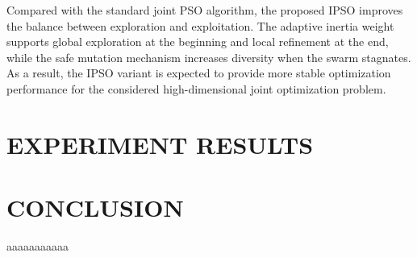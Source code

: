 \documentclass[conference]{IEEEtran}
\begin{document}
Compared with the standard joint PSO algorithm, the proposed IPSO improves the balance between exploration and exploitation. The adaptive inertia weight supports global exploration at the beginning and local refinement at the end, while the safe mutation mechanism increases diversity when the swarm stagnates. As a result, the IPSO variant is expected to provide more stable optimization performance for the considered high-dimensional joint optimization problem.



\section{EXPERIMENT RESULTS}
\label{sec:results}


\section{CONCLUSION}
aaaaaaaaaaa \cite{shan2020reinforcement}



\end{document}
